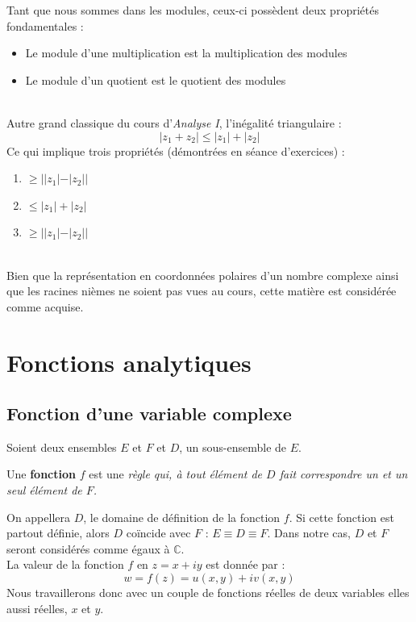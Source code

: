 Tant que nous sommes dans les modules, ceux-ci possèdent deux propriétés 
fondamentales :
\begin{itemize}
	\item Le module d'une multiplication est la multiplication des modules
	\item Le module d'un quotient est le quotient des modules
\end{itemize}\ \\
        
Autre grand classique du cours d'\textit{Analyse I}, l'inégalité triangulaire :
\begin{equation}
	|z_1 + z_2| \leq |z_1|+|z_2|
\end{equation}
Ce qui implique trois propriétés (démontrées en séance d'exercices) :
\begin{enumerate}
	\item {} $\geq ||z_1| - |z_2||$
	\item {} $\leq |z_1| + |z_2|$
	\item {} $\geq ||z_1| - |z_2||$
\end{enumerate}\ \\
        
Bien que la représentation en coordonnées polaires d'un nombre complexe ainsi que
les racines nièmes ne soient pas vues au cours, cette matière est considérée comme
acquise.

        
\section{Fonctions analytiques}
\subsection{Fonction d'une variable complexe}
Soient deux ensembles $E$ et $F$ et $D$, un sous-ensemble de $E$. 
\begin{center}
	Une \textbf{fonction}
	$f$ est une \textit{règle qui, à tout élément de $D$ fait correspondre un et un seul
	élément de $F$.}
\end{center}
On appellera $D$, le domaine de définition de la fonction $f$. Si cette fonction est 
partout définie, alors $D$ coïncide avec $F$ : $E \equiv D \equiv F$. Dans notre cas, $D$ et $F$
seront considérés comme égaux à $\mathbb{C}$.\\
La valeur de la fonction $f$ en $z = x+iy$ est donnée par :
\begin{equation}
	w = f(z) = u(x,y) + iv(x,y)
\end{equation}
Nous travaillerons donc avec un couple de  fonctions réelles de deux variables elles 
aussi réelles, $x$ et $y$.
    
